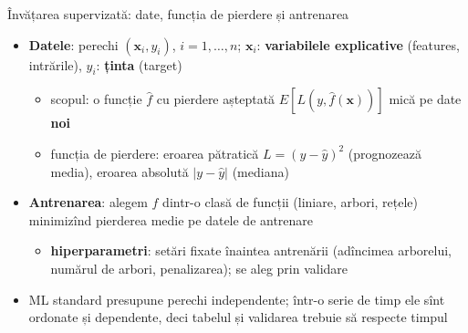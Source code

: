 \begin{frame}{Învățarea supervizată: date, funcția de pierdere și antrenarea}
\itemsize{\small}
\begin{itemize}
    \item \textbf{Datele}: perechi $(\mathbf{x}_i, y_i)$, $i = 1, \dots, n$; $\mathbf{x}_i$: \textbf{variabilele explicative} (features, intrările), $y_i$: \textbf{ținta} (target)
    \begin{itemize}
        \item scopul: o funcție $\hat f$ cu pierdere așteptată $E[L(y, \hat f(\mathbf{x}))]$ mică pe date \textbf{noi}
        \item funcția de pierdere: eroarea pătratică $L = (y - \hat y)^2$ (prognozează media), eroarea absolută $|y - \hat y|$ (mediana)
    \end{itemize}
    \item \textbf{Antrenarea}: alegem $\hat f$ dintr-o clasă de funcții (liniare, arbori, rețele) minimizînd pierderea medie pe datele de antrenare
    \begin{itemize}
        \item \textbf{hiperparametri}: setări fixate înaintea antrenării (adîncimea arborelui, numărul de arbori, penalizarea); se aleg prin validare
    \end{itemize}
    \item ML standard presupune perechi independente; într-o serie de timp ele sînt ordonate și dependente, deci tabelul și validarea trebuie să respecte timpul
\end{itemize}
\end{frame}

